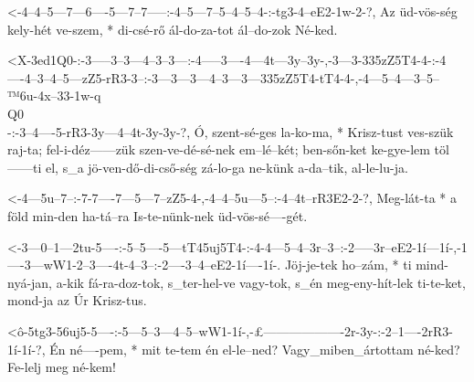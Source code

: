 
  {<-4--4--5---7---6----5---7--7-----:-4--5---7--5--4--5--4-:-tg3-4--eE2-1w-2-?,}
  {  Az üd-vös-ség kely-hét ve-szem, * di-csé-rő ál-do-za-tot ál--do-zok Né-ked.}

  {<X-3ed1Q0-:-3-----3--3---4--3--3---:-4-----3----4---4t---3y--3y-,-3---3-335zZ5T4-4-:-4----4--3--4--5---zZ5-rR3-3--:-3---3---3---4--3---3---335zZ5T4-tT4-4-,-4---5--4---3--5--™6u-4x--33-1w-q\\Q0\\-:-3--4----5-rR3-3y---4--4t-3y-3y-?,}
  {   Ó,       szent-sé-ges la-ko-ma, * Krisz-tust ves-szük raj-ta;  fel-i-déz------zük szen-ve-dé-sé-nek em--lé--két; ben-sőn-ket ke-gye-lem töl------ti  el, s_a jö-ven-dő-di-cső-ség zá-lo-ga        ne-künk a-da--tik, al-le-lu-ja.}



  {<-4---5u--7--:-7-7----7---5---7--zZ5-4-,-4--4--5u---5--:-4--4t--rR3E2-2-?,}
  {  Meg-lát-ta * a föld min-den ha-tá--ra  Is-te-nünk-nek  üd-vös-sé----gét.}


  {<-3---0--1---2tu-5----:-5--5----5---tT45uj5T4-:-4-4---5--4--3r--3--:-2-----3r--eE2-1í---1í-,-1----3---wW1-2--3----4t-4--3--:-2----3--4--eE2-1í----1í-.}
  {  Jöj-je-tek ho--zám, * ti mind-nyá-jan,        a-kik fá-ra-doz-tok, s_ter-hel-ve  vagy-tok, s_én meg-eny-hít-lek ti-te-ket, mond-ja az Úr  Krisz-tus.}


  {<ô-5tg3-56uj5-5----:-5---5--3---4--5--wW1-1í-,-£-------------------2r-3y-:-2--1----2rR3-1í-1í-?,}
  {   Én   né----pem, * mit te-tem én el-le--ned? Vagy_miben_ártottam né-ked? Fe-lelj meg  né-kem!}



